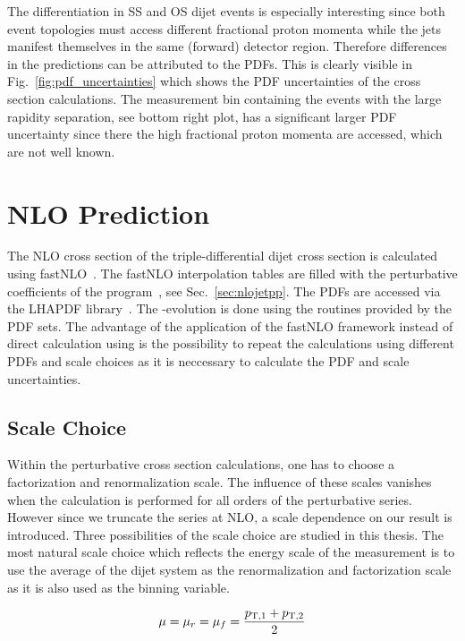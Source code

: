 The differentiation in SS and OS dijet events is especially interesting since
both event topologies must access different fractional proton momenta while the
jets manifest themselves in the same (forward) detector region. Therefore
differences in the predictions can be attributed to the PDFs. This is clearly
visible in Fig.~\ref{fig:pdf_uncertainties} which shows the PDF uncertainties of
the cross section calculations. The measurement bin containing the events with
the large rapidity separation, see bottom right plot, has a significant larger
PDF uncertainty since there the high fractional proton momenta are accessed,
which are not well known.

\section{NLO Prediction}

The NLO cross section of the triple-differential dijet cross section is
calculated using fastNLO~\cite{Kluge:2006xs,Britzger:2012bs}. The fastNLO
interpolation tables are filled with the perturbative coefficients of the
\NLOJETPP program~\cite{Nagy:2003tz}, see Sec.~\ref{sec:nlojetpp}. The PDFs are
accessed via the LHAPDF library~\cite{Whalley:2005nh,Buckley:2014ana}. The
\as-evolution is done using the routines provided by the PDF sets. The advantage
of the application of the fastNLO framework instead of direct calculation using
\NLOJETPP is the possibility to repeat the calculations using different PDFs and
scale choices as it is neccessary to calculate the PDF and scale uncertainties.

\subsection{Scale Choice}

Within the perturbative cross section calculations, one has to choose a
factorization and renormalization scale. The influence of these scales vanishes
when the calculation is performed for all orders of the perturbative series.
However since we truncate the series at NLO, a scale dependence on our result is
introduced. Three possibilities of the scale choice are studied in this thesis.
The most natural scale choice which reflects the energy scale of the measurement
is to use the average \pt of the dijet system as the renormalization and
factorization scale as it is also used as the binning variable. 

\begin{equation*}
    \mu = \mu_r = \mu_f = \frac{p_{\mathrm{T},1} + p_{\mathrm{T},2}}{2}
\end{equation*}

